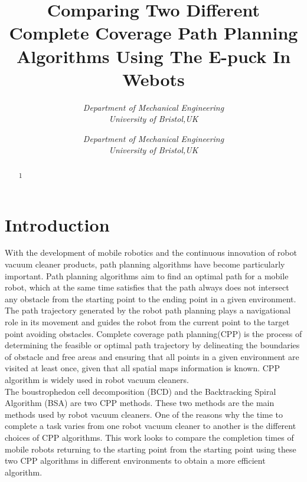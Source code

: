 \documentclass[conference]{IEEEtran}
\begin{document}
\title{Comparing Two Different Complete Coverage Path Planning Algorithms Using The E-puck In Webots}

\author{
    \textit{Department of Mechanical Engineering}\\
    \textit{University of Bristol,UK}
    \and
    \textit{Department of Mechanical Engineering}\\
    \textit{University of Bristol,UK}
}

\maketitle

\begin{abstract}
1
\end{abstract}


\section{Introduction}
With the development of mobile robotics and the continuous innovation of robot vacuum cleaner products, path planning algorithms have become particularly important. Path planning algorithms aim to find an optimal path for a mobile robot, which at the same time satisfies that the path always does not intersect any obstacle from the starting point to the ending point in a given environment. The path trajectory generated by the robot path planning plays a navigational role in its movement and guides the robot from the current point to the target point avoiding obstacles. Complete coverage path planning(CPP) is the process of determining the feasible or optimal path trajectory by delineating the boundaries of obstacle and free areas and ensuring that all points in a given environment are visited at least once, given that all spatial maps information is known. CPP algorithm is widely used in robot vacuum cleaners\cite{colegrave1994case}.\\
The boustrophedon cell decomposition (BCD)\cite{lavalle2006planning} and the Backtracking Spiral Algorithm (BSA)\cite{gonzalez2005bsa} are two CPP methods. These two methods are the main methods used by robot vacuum cleaners. One of the reasons why the time to complete a task varies from one robot vacuum cleaner to another is the different choices of CPP algorithms. This work looks to compare the completion times of mobile robots returning to the starting point from the starting point using these two CPP algorithms in different environments to obtain a more efficient algorithm.
\end{document}
